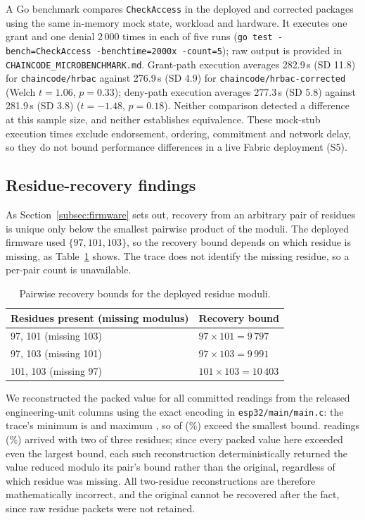 \documentclass[a4paper,fleqn]{cas-dc}
\begin{document}
A Go benchmark compares \texttt{CheckAccess} in the deployed and corrected
packages using the same in-memory mock state, workload and hardware. It
executes one grant and one denial 2\,000 times in each of five runs
(\texttt{go test -bench=CheckAccess -benchtime=2000x -count=5}); raw output
is provided in \texttt{CHAINCODE\_MICROBENCHMARK.md}. Grant-path
execution averages 282.9\,\textmu{}s (SD 11.8) for \texttt{chaincode/hrbac}
against 276.9\,\textmu{}s (SD 4.9) for \texttt{chaincode/hrbac-corrected}
(Welch $t=1.06$, $p=0.33$); deny-path execution averages 277.3\,\textmu{}s
(SD 5.8) against 281.9\,\textmu{}s (SD 3.8) ($t=-1.48$, $p=0.18$).
Neither comparison detected a difference at this sample size, and neither
establishes equivalence. These mock-stub execution times exclude endorsement,
ordering, commitment and network delay, so they do not bound performance
differences in a live Fabric deployment (S5).

\subsection{Residue-recovery findings}
\label{subsec:pm_crt}

As Section~\ref{subsec:firmware} sets out, recovery from an arbitrary pair
of residues is unique only below the smallest pairwise product of the
moduli. The deployed firmware used $\{97, 101, 103\}$, so the recovery
bound depends on which residue is missing, as Table~\ref{tab:crtpairs}
shows. The trace does not identify the missing residue, so a per-pair count
is unavailable.

\begin{table}[t]
\caption{Pairwise recovery bounds for the deployed residue moduli.}
\label{tab:crtpairs}
\small
\begin{tabularx}{\columnwidth}{@{}lX@{}}
\toprule
Residues present (missing modulus) & Recovery bound \\
\midrule
97, 101 (missing 103) & $97\times 101 = 9\,797$ \\
97, 103 (missing 101) & $97\times 103 = 9\,991$ \\
101, 103 (missing 97) & $101\times 103 = 10\,403$ \\
\bottomrule
\end{tabularx}
\end{table} We reconstructed the packed
value for all \CRTExceedN{} committed readings from the released
engineering-unit columns using the exact encoding in
\texttt{esp32/main/main.c}: the trace's minimum is \CRTPackedMin{} and
maximum \CRTPackedMax{}, so \CRTExceedCount{} of \CRTExceedN{}
(\CRTExceedPct\%) exceed the smallest bound. \CRTRecovered{} readings
(\CRTLossRatePct\%) arrived with two of three residues; since every
packed value here exceeded even the largest bound, each such
reconstruction deterministically returned the value reduced modulo its
pair's bound rather than the original, regardless of which residue was
missing. All \CRTRecovered{} two-residue reconstructions are therefore
mathematically incorrect, and the original cannot be recovered after the
fact, since raw residue packets were not retained.
\end{document}
